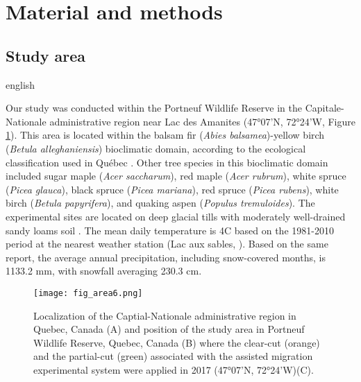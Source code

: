 \section*{Material and methods}
\label{sec:matmet1}

\subsection*{Study area}
\label{subsec:area}

\begin{otherlanguage*}{english}

  Our study was conducted within the Portneuf Wildlife Reserve in the Capitale-Nationale administrative region near Lac des Amanites (47°07’N, 72°24’W, Figure \ref{fig:area}). 
  This area is located within the balsam fir (\textit{Abies balsamea})-yellow birch (\textit{Betula alleghaniensis}) bioclimatic domain, according to the ecological classification used in Québec \citep{saucierChapitreEcologieForestiere2009}. 
  Other tree species in this bioclimatic domain included sugar maple (\textit{Acer saccharum}), red maple (\textit{Acer rubrum}), white spruce (\textit{Picea glauca}), black spruce (\textit{Picea mariana}), red spruce (\textit{Picea rubens}), white birch (\textit{Betula papyrifera}), and quaking aspen (\textit{Populus tremuloides})\citep{olaBelowgroundCarbonStocks2024}. 
  The experimental sites are located on deep glacial tills with moderately well-drained sandy loams soil \citep{CanadianSystemSoil1998}. 
  The mean daily temperature is 4C based on the 1981-2010 period at the nearest weather station (Lac aux sables, \citealp{environmentcanadaCanadianClimateNormals2019}). 
  Based on the same report, the average annual precipitation, including snow-covered months, is 1133.2 mm, with snowfall averaging 230.3 cm.

\end{otherlanguage*}

\begin{figure}[ht!]
	\centering
	\texttt{[image: fig\_area6.png]}
	\caption[Localization of the Capitale-Nationale administrative region in Quebec, Canada and position of the study area near Lac des Amanites in Portneuf Wildlife Reserve, Quebec, Canada.]
  {Localization of the Captial-Nationale administrative region in Quebec, Canada (A) and position of the study area in Portneuf Wildlife Reserve, Quebec, Canada (B) where the clear-cut (orange) and the partial-cut (green) associated with the assisted migration experimental system were applied in 2017 (47°07'N, 72°24'W)(C).}
	\label{fig:area}
	\end{figure}  


